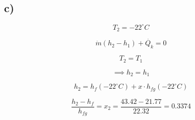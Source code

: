 

\subsection*{c)}

\[ T_2 = -22^\circ C \]

\[
\dot{m}(h_2 - h_1) + \dot{Q_k} = 0
\]

\[ T_2 = T_1 \]

\[ \implies h_2 = h_1 \]

\[ h_2 = h_f(-22^\circ C) + x \cdot h_{fg}(-22^\circ C) \]

\[
\frac{h_2 - h_f}{h_{fg}} = x_2 = \frac{43.42 - 21.77}{22.32} = 0.3374
\]